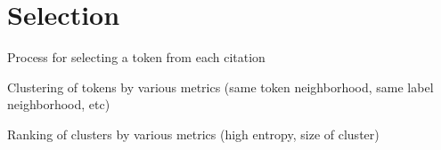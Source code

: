 \section{Selection}

Process for selecting a token from each citation \newline

\noindent Clustering of tokens by various metrics (same token neighborhood, same label neighborhood, etc) \newline

\noindent Ranking of clusters by various metrics (high entropy, size of cluster)





